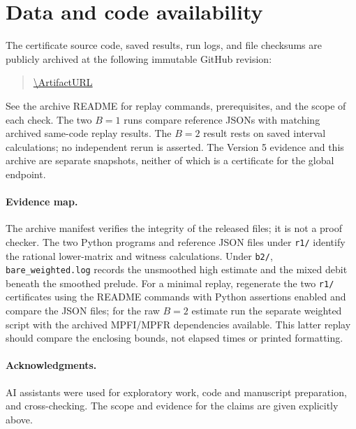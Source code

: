 \documentclass[11pt,a4paper]{article}
\numberwithin{equation}{section}
\theoremstyle{definition}\newtheorem{definition}[theorem]{Definition}
\theoremstyle{remark}\newtheorem{remark}[theorem]{Remark}
\begin{document}
\clearpage
\section{Data and code availability}
The certificate source code, saved results, run logs, and file checksums are publicly archived at the following immutable GitHub revision:
\begin{quote}\small\raggedright\expandafter\url\expandafter{\ArtifactURL}\end{quote}
See the archive README for replay commands, prerequisites, and the scope of each check. The two $B=1$ runs compare reference JSONs with matching archived same-code replay results. The $B=2$ result rests on saved interval calculations; no independent rerun is asserted. The Version 5 evidence and this archive are separate snapshots, neither of which is a certificate for the global endpoint.

\paragraph{Evidence map.}
The archive manifest verifies the integrity of the released files; it is not a proof checker. The two Python programs and reference JSON files under \texttt{r1/} identify the rational lower-matrix and witness calculations. Under \texttt{b2/}, \texttt{bare\_weighted.log} records the unsmoothed high estimate and the mixed debit beneath the smoothed prelude. For a minimal replay, regenerate the two \texttt{r1/} certificates using the README commands with Python assertions enabled and compare the JSON files; for the raw $B=2$ estimate run the separate weighted script with the archived MPFI/MPFR dependencies available. This latter replay should compare the enclosing bounds, not elapsed times or printed formatting.

\paragraph{Acknowledgments.}
AI assistants were used for exploratory work, code and manuscript preparation, and cross-checking. The scope and evidence for the claims are given explicitly above.
\end{document}
